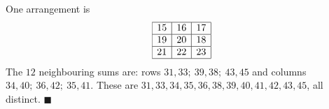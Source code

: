 One arrangement is
\[\begin{array}{|c|c|c|}\hline15&16&17\\\hline19&20&18\\\hline21&22&23\\\hline\end{array}\]
The $12$ neighbouring sums are: rows $31,33;\ 39,38;\ 43,45$ and columns $34,40;\ 36,42;\ 35,41$. These are $31,33,34,35,36,38,39,40,41,42,43,45$, all distinct. $\blacksquare$
